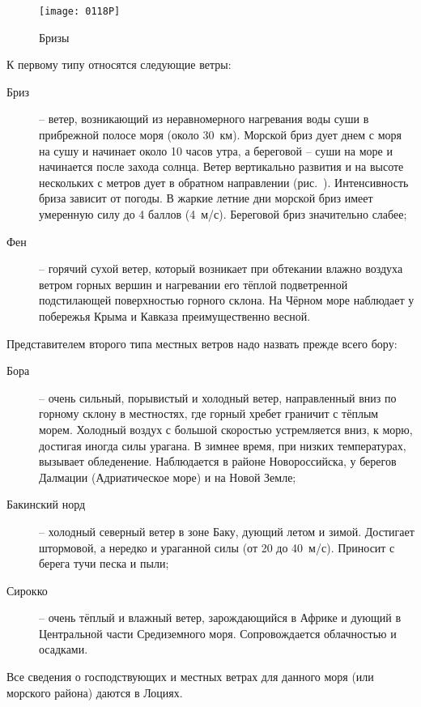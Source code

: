 \begin{figure}[!htb]
  \centering{}
  \texttt{[image: 0118P]}
  \caption{Бризы}
  \label{fig:118}
\end{figure}

К первому типу относятся следующие ветры:
\begin{description}
\item [Бриз] \--- ветер, возникающий из неравномерного нагревания воды
  суши в прибрежной полосе моря (около 30~км). Морской бриз
  дует днем с моря на сушу и начинает около 10 часов утра, а береговой
  \--- суши на море и начинается после захода солнца. Ветер
  вертикально развития и на высоте нескольких с метров дует в обратном
  направлении (рис.~). Интенсивность бриза зависит от
  погоды. В жаркие летние дни морской бриз имеет умеренную силу до 4
  баллов (4~м/с). Береговой бриз значительно слабее;
\item[Фен] \--- горячий сухой ветер, который возникает при обтекании
  влажно воздуха ветром горных вершин и нагревании его тёплой
  подветренной подстилающей поверхностью горного склона. На Чёрном
  море наблюдает у побережья Крыма и Кавказа преимущественно весной.
\end{description}

Представителем второго типа местных ветров надо назвать прежде всего
бору:
\begin{description}
\item[Бора] \--- очень сильный, порывистый и холодный
  ветер, направленный вниз по горному склону в местностях, где горный
  хребет граничит с тёплым морем. Холодный воздух с большой скоростью
  устремляется вниз, к морю, достигая иногда силы урагана. В зимнее
  время, при низких температурах, вызывает обледенение. Наблюдается в
  районе Новороссийска, у берегов Далмации (Адриатическое море) и на
  Новой Земле;
\item[Бакинский норд] \--- холодный северный
  ветер в зоне Баку, дующий летом и зимой. Достигает штормовой, а
  нередко и ураганной силы (от 20 до 40~м/с). Приносит с берега тучи
  песка и пыли;
\item[Сирокко] \--- очень тёплый и влажный ветер,
  зарождающийся в Африке и дующий в Центральной части Средиземного
  моря. Сопровождается облачностью и осадками.
\end{description}

Все сведения о господствующих и
местных ветрах для данного моря (или
морского района) даются в Лоциях.

